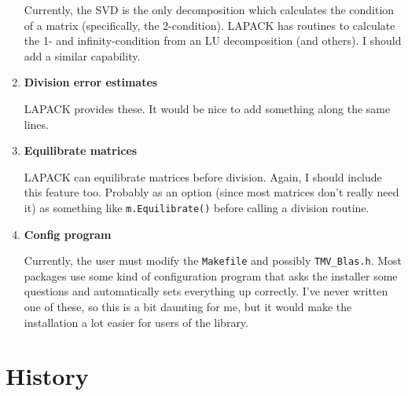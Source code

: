 \documentclass[twoside,letterpaper,11pt]{article}
\renewcommand{\tt}[1]{{\texttt {#1}}}
\begin{document}
\begin{enumerate}
Currently, the SVD is the only decomposition which calculates the condition
of a matrix (specifically, the 2-condition).  
LAPACK has routines to calculate the 1- and infinity-condition
from an LU decomposition (and others).  I should add a similar capability.

\item
\textbf{Division error estimates}

LAPACK provides these.  It would be nice to add something along the same lines.

\item
\textbf{Equilibrate matrices}

LAPACK can equilibrate matrices before division.  Again, I should include this
feature too.  Probably as an option (since most matrices don't really need it)
as something like \tt{m.Equilibrate()} before calling a division routine.

\item
\textbf{Config program}

Currently, the user must modify the \tt{Makefile} and possibly 
\tt{TMV\_Blas.h}.  Most packages use some kind of configuration program
that asks the installer some questions and automatically sets everything
up correctly.  I've never written one of these, so this is a bit 
daunting for me, but it would make the 
installation a lot easier for users of the library.

\end{enumerate}

\newpage
\section{History}
\label{history}
\end{document}
